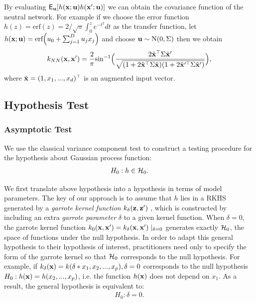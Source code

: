 \documentclass[article]{jss}
\begin{document}
By evaluating $\mathsf{E}_{\bf u}[h({\bf x}; {\bf u})h({\bf x}'; {\bf u})]$ we can obtain the covariance function of the neutral network. For example if we choose the error function $h(z)=\mbox{erf}(z)=2/\sqrt{\pi}\int_0^z e^{-t^2}dt$ as the transfer function, let $h({\bf x};{\bf u})=\mbox{erf}\Big(u_0+\sum_{j=1}^Du_jx_j\Big)$ and choose ${\bf u} \sim \mathrm{N}(0, \Sigma)$ then we obtain
\begin{align*}
k_{NN}({\bf x}, {\bf x}')=\frac{2}{\pi}\mbox{sin}^{-1}\Big(\frac{2\tilde{{\bf x}}^\top \Sigma \tilde{{\bf x}}'}{\sqrt{(1+2\tilde{{\bf x}}^\top \Sigma \tilde{{\bf x}})(1+2\tilde{{\bf x}}'^\top \Sigma \tilde{{\bf x}}')}}\Big),
\end{align*}
where $\tilde{{\bf x}}=(1, x_1, ..., x_d)^\top $ is an augmented input vector.


\subsection{Hypothesis Test}
\setcounter{equation}{0}
\renewcommand{\theequation}{2.2.\arabic{equation}}
\subsubsection{{Asymptotic Test}}

We use the classical variance component test \citep{lin_variance_1997} to construct a testing procedure for the hypothesis about Gaussian process function:
\begin{align}
H_0: h \in {\cal H}_0.
\end{align}

We first translate above hypothesis into a hypothesis in terms of model parameters. The key of our approach is to assume that $h$ lies in a RKHS generated by a \emph{garrote kernel function} $k_{\delta}({\bf z}, {\bf z}')$ \citep{maity_powerful_2011}, which is constructed by including an extra \emph{garrote parameter} $\delta$ to a given kernel function. When $\delta=0$, the garrote kernel function $k_0({\bf x}, {\bf x}')=k_{\delta}({\bf x}, {\bf x}')\mid _{\delta=0}$ generates exactly ${\cal H}_0$, the space of functions under the null hypothesis. In order to adapt this general hypothesis to their hypothesis of interest, practitioners need only to specify the form of the garrote kernel so that ${\cal H}_0$ corresponds to the null hypothesis. For example, if $k_{\delta}({\bf x})=k(\delta * x_1, x_2,..., x_p), \delta=0$ corresponds to the null hypothesis $H_0: h({\bf x})=h(x_2,...,x_p)$, i.e. the function $h({\bf x})$ does not depend on $x_1$. As a result, the general hypothesis is equivalent to:
\begin{align}
H_0: \delta=0. \label{10}
\end{align}
\end{document}
